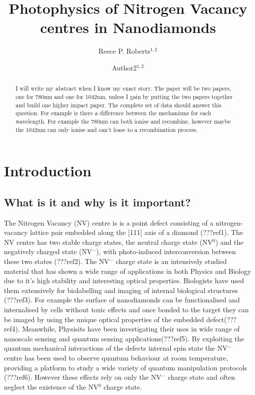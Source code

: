 \documentclass[prl]{revtex4}
\begin{document}
\title{Photophysics of Nitrogen Vacancy centres in Nanodiamonds}
  
\author{Reece P. Roberts$^{1,2}$}
\author{Author2$^{1,2}$}



\begin{abstract}
I will write my abstract when I know my exact story.
The paper will be two papers, one for 780nm and one for 1042nm, unless I gain by putting the two papers together and build one higher impact paper.
The complete set of data should answer this question.
For example is there a difference between the mechanisms for each wavelength. For example the 780nm can both ionise and recombine, however maybe the 1042nm can only ionise and can't lease to a recombination process.
\end{abstract}

\maketitle

\section{Introduction}
\subsection{What is it and why is it important?}
The Nitrogen Vacancy (NV) centre is is a point defect consisting of a nitrogen-vacancy lattice pair embedded along the [111] axis of a diamond (???ref1). The NV centre has two stable charge states, the neutral charge state (NV$^0$) and the negatively charged state (NV$^-$), with photo-induced interconversion between these two states (???ref2). The NV$^-$ charge state is an intensively studied material that has shown a wide range of applications in both Physics and Biology due to it's high stability and interesting optical properties. Biologists have used them extensively for biolabelling and imaging of internal biological structures (???ref3). For example the surface of nanodiamonds can be functionalised and internalised by cells without toxic effects and once bonded to the target they can be imaged by using the unique optical properties of the embedded defect(???ref4). Meanwhile, Physisits have been investigating their uses in wide range of nanoscale sensing and quantum sensing applications(???ref5). By exploiting the quantum mechanical interactions of the defects internal spin state the NV$^-$ centre has been used to observe quantum behaviour at room temperature, providing a platform to study a wide variety of quantum manipulation protocols (???ref6). However these effects rely on only the NV$^-$ charge state and often neglect the  existence of the NV$^0$ charge state. 
\end{document}
